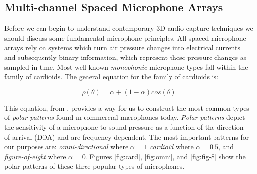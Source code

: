 \subsection{Multi-channel Spaced Microphone Arrays}

Before we can begin to understand contemporary 3D audio capture techniques we should discuss some fundamental microphone principles. All spaced microphone arrays rely on systems which turn air pressure changes into electrical currents and subsequently binary information, which represent these pressure changes as sampled in time. Most well-known \textit{monophonic} microphone types fall within the family of cardioids. The general equation for the family of cardioids is:

\begin{equation}
    \rho(\theta) = \alpha + (1-\alpha)cos(\theta)
\end{equation}

This equation, from \cite{ortolani2015introduction}, provides a way for us to construct the most common types of \textit{polar patterns} found in commercial microphones today. \textit{Polar patterns} depict the sensitivity of a microphone to sound pressure as a function of the direction-of-arrival (DOA) and are frequency dependent. The most important patterns for our purposes are: \textit{omni-directional} where $\alpha=1$ \textit{cardioid} where $\alpha = 0.5$, and \textit{figure-of-eight} where $\alpha=0$. Figures \ref{fig:card}, \ref{fig:omni}, and \ref{fig:fig-8} show the polar patterns of these three popular types of microphones. 


